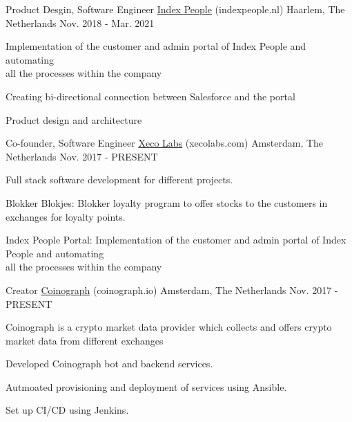 

\begin{cventries}

  \cventry
    {Product Desgin, Software Engineer} %
    {\href{https://indexpeople.nl}{Index People} (indexpeople.nl)} %
    {Haarlem, The Netherlands} %
    {Nov. 2018 - Mar. 2021} %
    {
      \begin{cvitems} %
      \item {
        Implementation of the customer and admin portal of Index People and automating\\ all the processes within the company
        }
      \item {Creating bi-directional connection between Salesforce and the portal}
      \item {Product design and architecture}
      \end{cvitems}
	}
  \cventry
    {Co-founder, Software Engineer} %
    {\href{https://www.xecolabs.com}{Xeco Labs} (xecolabs.com)} %
    {Amsterdam, The Netherlands} %
    {Nov. 2017 - PRESENT} %
    {
      \begin{cvitems} 
      \item {Full stack software development for different projects.}
      \item {Blokker Blokjes: Blokker loyalty program to offer stocks to the customers in exchanges for loyalty points.}
      \item {Index People Portal: Implementation of the customer and admin portal of Index People and automating\\ all the processes within the company}
      \end{cvitems}
    }

  \cventry
    {Creator} %
    {\href{https://www.coinograph.io}{Coinograph} (coinograph.io)} %
    {Amsterdam, The Netherlands} %
    {Nov. 2017 - PRESENT} %
    {
      \begin{cvitems} %
      \item {Coinograph is a crypto market data provider which collects and offers crypto market data from different exchanges}
      \item {Developed Coinograph bot and backend services.}
      \item {Autmoated provisioning	and deployment of services using Ansible.}
      \item {Set up CI/CD using Jenkins.}	
      \end{cvitems}
    }


\end{cventries}
